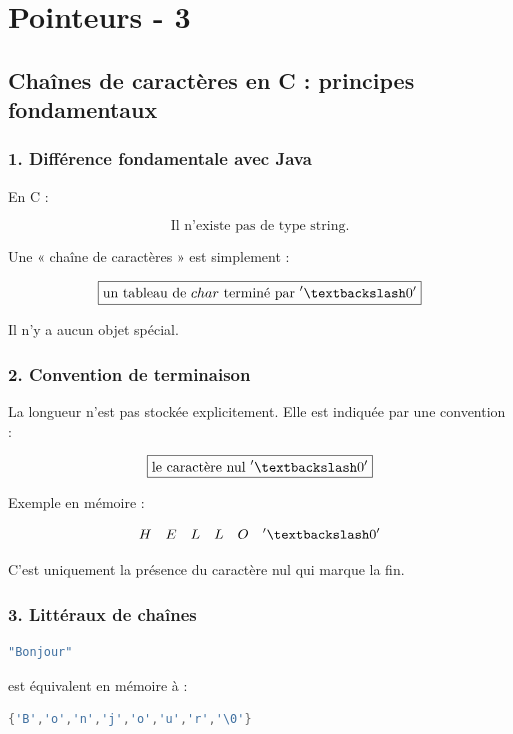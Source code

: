 
\chapter{Pointeurs - 3}
\label{chap:pointeurs_}

\section{Chaînes de caractères en C : principes fondamentaux}

\subsection{1. Différence fondamentale avec Java}

En C :

\[
\boxed{\text{Il n’existe pas de type string.}}
\]

Une « chaîne de caractères » est simplement :

\[
\boxed{\text{un tableau de } char \text{ terminé par } '\textbackslash 0'}
\]

Il n’y a aucun objet spécial.

\subsection{2. Convention de terminaison}

La longueur n’est pas stockée explicitement.
Elle est indiquée par une convention :

\[
\boxed{\text{le caractère nul } '\textbackslash 0'}
\]

Exemple en mémoire :

\[
H \quad E \quad L \quad L \quad O \quad '\textbackslash 0'
\]

C’est uniquement la présence du caractère nul qui marque la fin.

\subsection{3. Littéraux de chaînes}

\begin{lstlisting}[language=C]
"Bonjour"
\end{lstlisting}

est équivalent en mémoire à :

\begin{lstlisting}[language=C]
{'B','o','n','j','o','u','r','\0'}
\end{lstlisting}

